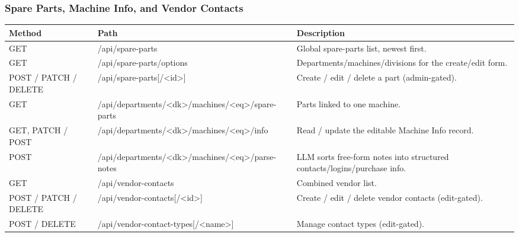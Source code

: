 \documentclass[11pt,a4paper]{article}
\newcommand{\sbrk}{\hspace{0pt}}
\begin{document}
\subsubsection{Spare Parts, Machine Info, and Vendor Contacts}
\begin{longtable}{@{}p{}>{\ttfamily\small}p{}p{}@{}}
\toprule
\textbf{Method} & \textbf{Path} & \textbf{Description} \\
\midrule
\endhead
GET & /\sbrk api/\sbrk spare-parts & Global spare-parts list, newest first. \\
GET & /\sbrk api/\sbrk spare-parts/\sbrk options & Departments/machines/divisions for the create/edit form. \\
POST / PATCH / DELETE & /\sbrk api/\sbrk spare-parts[/\sbrk <id>] & Create / edit / delete a part (admin-gated). \\
GET & /\sbrk api/\sbrk departments/\sbrk <dk>/\sbrk machines/\sbrk <eq>/\sbrk spare-parts & Parts linked to one machine. \\
GET, PATCH / POST & /\sbrk api/\sbrk departments/\sbrk <dk>/\sbrk machines/\sbrk <eq>/\sbrk info & Read / update the editable Machine Info record. \\
POST & /\sbrk api/\sbrk departments/\sbrk <dk>/\sbrk machines/\sbrk <eq>/\sbrk parse-notes & LLM sorts free-form notes into structured contacts/logins/purchase info. \\
GET & /\sbrk api/\sbrk vendor-contacts & Combined vendor list. \\
POST / PATCH / DELETE & /\sbrk api/\sbrk vendor-contacts[/\sbrk <id>] & Create / edit / delete vendor contacts (edit-gated). \\
POST / DELETE & /\sbrk api/\sbrk vendor-contact-types[/\sbrk <name>] & Manage contact types (edit-gated). \\
\bottomrule
\end{longtable}
\end{document}
